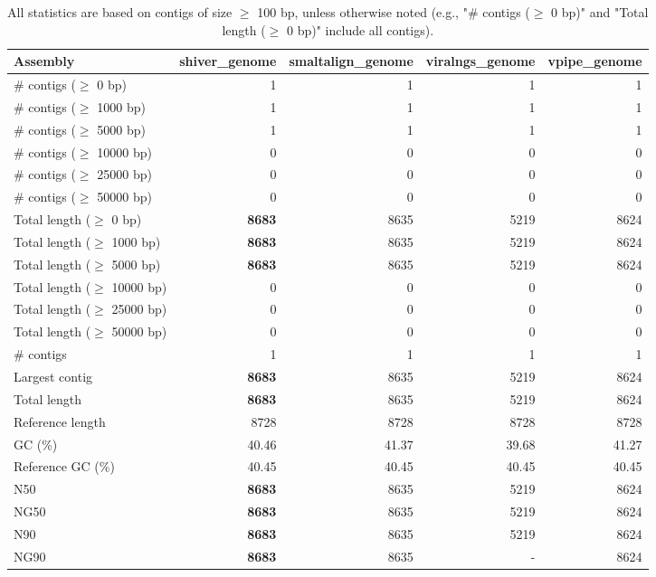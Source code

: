 \documentclass[12pt,a4paper]{article}
\begin{document}
\begin{table}[ht]
\begin{center}
\caption{All statistics are based on contigs of size $\geq$ 100 bp, unless otherwise noted (e.g., "\# contigs ($\geq$ 0 bp)" and "Total length ($\geq$ 0 bp)" include all contigs).}
\begin{tabular}{|l*{4}{|r}|}
\hline
Assembly & shiver\_genome & smaltalign\_genome & viralngs\_genome & vpipe\_genome \\ \hline
\# contigs ($\geq$ 0 bp) & 1 & 1 & 1 & 1 \\ \hline
\# contigs ($\geq$ 1000 bp) & 1 & 1 & 1 & 1 \\ \hline
\# contigs ($\geq$ 5000 bp) & 1 & 1 & 1 & 1 \\ \hline
\# contigs ($\geq$ 10000 bp) & 0 & 0 & 0 & 0 \\ \hline
\# contigs ($\geq$ 25000 bp) & 0 & 0 & 0 & 0 \\ \hline
\# contigs ($\geq$ 50000 bp) & 0 & 0 & 0 & 0 \\ \hline
Total length ($\geq$ 0 bp) & {\bf 8683} & 8635 & 5219 & 8624 \\ \hline
Total length ($\geq$ 1000 bp) & {\bf 8683} & 8635 & 5219 & 8624 \\ \hline
Total length ($\geq$ 5000 bp) & {\bf 8683} & 8635 & 5219 & 8624 \\ \hline
Total length ($\geq$ 10000 bp) & 0 & 0 & 0 & 0 \\ \hline
Total length ($\geq$ 25000 bp) & 0 & 0 & 0 & 0 \\ \hline
Total length ($\geq$ 50000 bp) & 0 & 0 & 0 & 0 \\ \hline
\# contigs & 1 & 1 & 1 & 1 \\ \hline
Largest contig & {\bf 8683} & 8635 & 5219 & 8624 \\ \hline
Total length & {\bf 8683} & 8635 & 5219 & 8624 \\ \hline
Reference length & 8728 & 8728 & 8728 & 8728 \\ \hline
GC (\%) & 40.46 & 41.37 & 39.68 & 41.27 \\ \hline
Reference GC (\%) & 40.45 & 40.45 & 40.45 & 40.45 \\ \hline
N50 & {\bf 8683} & 8635 & 5219 & 8624 \\ \hline
NG50 & {\bf 8683} & 8635 & 5219 & 8624 \\ \hline
N90 & {\bf 8683} & 8635 & 5219 & 8624 \\ \hline
NG90 & {\bf 8683} & 8635 & - & 8624 \\ \hline

\end{tabular}
\end{center}
\end{table}
\end{document}

